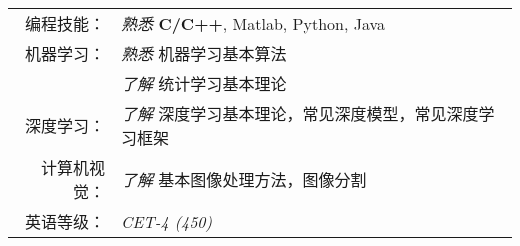 %
%


 
\renewcommand{\arraystretch}{1.1}

	\begin{tabular}{>{}r>{}p{13cm}} 
		\textsc{编程技能：}     &  \emph{熟悉} \quad \textbf{C/C++}, Matlab, Python, Java\\  
		\textsc{机器学习：} 	&  \emph{熟悉} \quad  机器学习基本算法 \\
							    &  \emph{了解} \quad  统计学习基本理论 \\
	    \textsc{深度学习：}     &  \emph{了解} \quad 深度学习基本理论，常见深度模型，常见深度学习框架 \\
		\textsc{计算机视觉：}   &  \emph{了解} \quad  基本图像处理方法，图像分割  \\
		\textsc{英语等级：}	    &  \textit{CET-4 (450)}
	\end{tabular}
	
